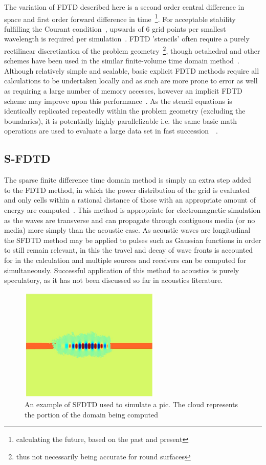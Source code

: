 \documentclass{svproc}
\begin{document}
 The variation of FDTD described here is a second order central difference in space and first order forward difference in time~\footnote{calculating the future, based on the past and present}. For acceptable stability fulfilling the Courant condition~\cite{Abdulkadir2015}, upwards of 6 grid points per smallest wavelength is required per simulation~\cite{Oxnard2015}. FDTD 'stencils' often require a purely rectilinear discretization of the problem geometry~\footnote{thus not necessarily being accurate for round surfaces}, though octahedral and other schemes have been used in the similar finite-volume time domain method~\cite{Bilbao2016}. Although relatively simple and scalable, basic explicit FDTD methods require all calculations to be undertaken locally and as such are more prone to error as well as requiring a large number of memory accesses, however an implicit FDTD scheme may improve upon this performance~\cite{Hamilton2014}. As the stencil equations is identically replicated repeatedly within the problem geometry (excluding the boundaries), it is potentially highly parallelizable i.e. the same basic math operations are used to evaluate a large data set in fast succession~\cite{Savioja2010}~\cite{Angus2010}.

\subsection{S-FDTD}
The sparse finite difference time domain method is simply an extra step added~\cite{excluding some extra boundary handling to ensure stability} to the FDTD method, in which the power distribution of the grid is evaluated and only cells within a rational distance of those with an appropriate amount of energy are computed~\cite{Doerr2013}. This method is appropriate for electromagnetic simulation as the waves are transverse and can propagate through contiguous media (or no media) more simply than the acoustic case. As acoustic waves are longitudinal the SFDTD method may be applied to pulses such as Gaussian functions in order to still remain relevant, in this the travel and decay of wave fronts is accounted for in the calculation and multiple sources and receivers can be computed for simultaneously. Successful application of this method to acoustics is purely speculatory, as it has not been discussed so far in acoustics literature. 
\begin{figure}
\centering
\includegraphics[width=0.6\textwidth]{sparsefdtd.jpg}
\centering
\caption{An example of SFDTD used to simulate a pic. The cloud represents the portion of the domain being computed ~\cite{Doerr2013}}
\end{figure}
\end{document}
